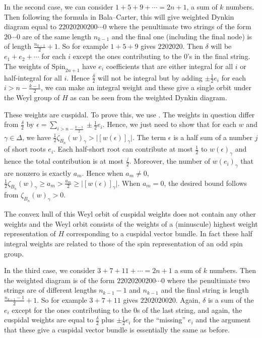 \documentclass{amsart}
\theoremstyle{definition}
\theoremstyle{remark}
\numberwithin{equation}{section}
\newcommand{\Spin}{\mathrm{Spin}}
\begin{document}
In the second case, we can consider $1+5+9+\cdots=2n+1$, a sum of $k$ numbers. Then following the formula in Bala--Carter, this will give weighted Dynkin diagram equal to $22020200200\cdots 0$ where the penultimate two strings of the form $20\cdots 0$ are of the same length $n_{k-1}$ and the final one (including the final node) is of length $\frac{n_{k-1}}{2} + 1$. So for example $1+5+9$ gives $2202020$. Then $\delta$ will be $e_1+e_2+\cdots$ for each $i$ except the ones contributing to the $0$'s in the final string. The weights of $\Spin_{2n+1}$ have $e_i$ coefficients that are either integral for all $i$ or half-integral for all $i$. Hence $\frac{\delta}{2}$ will not be integral but by adding $\pm \frac{1}{2}e_i$ for each $i > n - \frac{k-1}{2}$, we can make an integral weight and these give a single orbit under the Weyl group of $H$ as can be seen from the weighted Dynkin diagram. 

These weights are cuspidal. To prove this, we use \cite[(3)]{BMKL}. The weights in question differ from $\frac{\delta}{2}$ by $\epsilon = \sum\limits_{i > n - \frac{k-1}{2}} \pm \frac{1}{2}e_i$. Hence, we just need to show that for each $w$ and $\gamma \in \Delta$, we have $\frac{1}{2}\zeta_{B_n}(w)_{\gamma} > \lvert[w(\epsilon)]_{\gamma}\rvert$. The term $\epsilon$ is a half sum of a number $j$ of short roots $e_i$. Each half-short root can contribute at most $\frac{1}{2}$ to $w(\epsilon)_{\gamma}$ and hence the total contribution is at most $\frac{j}{2}$. Moreover, the number of $w(e_i)_{\gamma}$ that are nonzero is exactly $a_m$. Hence when $a_m \neq 0$, $\frac{1}{2}\zeta_{B_n}(w)_{\gamma}\geq a_m > \frac{a_m}{2} \geq \lvert[w(\epsilon)]_{\gamma}\rvert$. When $a_m=0$, the desired bound follows from $\zeta_{B_n}(w)_{\gamma} > 0$.

The convex hull of this Weyl orbit of cuspidal weights does not contain any other weights and the Weyl orbit consists of the weights of a (minuscule) highest weight representation of $H$ corresponding to a cuspidal vector bundle. In fact these half integral weights are related to those of the spin representation of an odd spin group.

In the third case, we consider $3+7+11+\cdots=2n+1$ a sum of $k$ numbers. Then the weighted diagram is of the form $22020200200\cdots 0$ where the penultimate two strings are of different lengths $n_{k-1} - 1$ and $n_{k-1}$ and the final string is length $\frac{n_{k-1}-1}{2} +1$. So for example $3+7+11$ gives $2202020020$. Again, $\delta$ is a sum of the $e_i$ except for the ones contributing to the $0$s of the last string, and again, the cuspidal weights are equal to $\frac{\delta}{2}$ plus $\pm \frac{1}{2}e_i$ for the ``missing'' $e_i$ and the argument that these give a cuspidal vector bundle is essentially the same as before.
\end{document}
